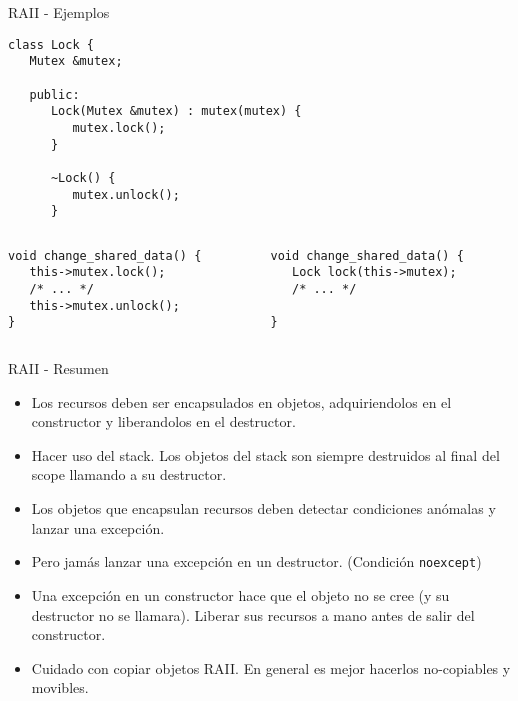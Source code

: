 \begin{frame}[fragile]{RAII - Ejemplos}
   \begin{lstlisting}[style=normal]
class Lock {
   Mutex &mutex;

   public:
      Lock(Mutex &mutex) : mutex(mutex) {
         mutex.lock();
      }

      ~Lock() {
         mutex.unlock();
      }
   \end{lstlisting}
   \begin{columns}
      \begin{column}{.5\linewidth}
         \begin{lstlisting}[style=normal]
void change_shared_data() {
   this->mutex.lock();
   /* ... */
   this->mutex.unlock();
}
         \end{lstlisting}
      \end{column}
      \begin{column}{.4\linewidth}
         \begin{lstlisting}[style=normal]
void change_shared_data() {
   Lock lock(this->mutex);
   /* ... */

}
         \end{lstlisting}
      \end{column}
   \end{columns}
\end{frame}

\begin{frame}[fragile]{RAII - Resumen}
   \begin{itemize}
      \item Los recursos deben ser encapsulados en objetos, adquiriendolos en el constructor y liberandolos en el destructor.
      \item Hacer uso del stack. Los objetos del stack son siempre destruidos al final del scope llamando a su destructor.
      \item Los objetos que encapsulan recursos deben detectar condiciones an\'omalas y lanzar una excepci\'on.
      \item Pero \alert{jam\'as} lanzar una excepci\'on en un destructor. (Condici\'on \lstinline[style=normal]!noexcept!)
      \item Una excepci\'on en un constructor hace que el objeto no se cree (y su destructor no se llamara). Liberar sus recursos \alert{a mano} antes de salir del constructor.
      \item Cuidado con copiar objetos RAII. En general es mejor hacerlos no-copiables y movibles.
   \end{itemize}
\end{frame}


